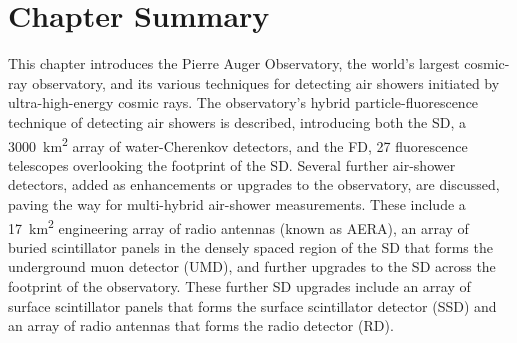 
\section{Chapter Summary}\label{sec:ch3_summary}
This chapter introduces the Pierre Auger Observatory, the world's largest cosmic-ray observatory, and its various techniques for detecting air showers initiated by ultra-high-energy cosmic rays.
The observatory's hybrid particle-fluorescence technique of detecting air showers is described, introducing both the SD, a \qty{3000}{\kilo\meter\squared} array of water-Cherenkov detectors, and the FD, 27 fluorescence telescopes overlooking the footprint of the SD.
Several further air-shower detectors, added as enhancements or upgrades to the observatory, are discussed, paving the way for multi-hybrid air-shower measurements.
These include a \qty{17}{\kilo\meter\squared} engineering array of radio antennas (known as AERA), an array of buried scintillator panels in the densely spaced region of the SD that forms the underground muon detector (UMD), and further upgrades to the SD across the footprint of the observatory.
These further SD upgrades include an array of surface scintillator panels that forms the surface scintillator detector (SSD) and an array of radio antennas that forms the radio detector (RD).



